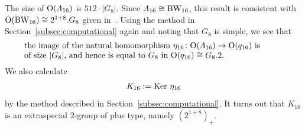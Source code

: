 \documentclass{amsart} %
\begin{document}
%
%
%
 The size of $\mathord{\mathrm{O}}(\varLambda_{16})$ is $512\cdot |G_8|$.
 Since $\varLambda_{16}\cong \mathrm{BW}_{16}$, 
this result is consistent with $\mathord{\mathrm{O}}(\mathrm{BW}_{16})\cong 2^{1+8}.G_8$
given in~\cite[Chapter 4, Section 10]{theCSbook}.
Using the method in Section~\ref{subsec:computational} again
and noting that $G_8$ is simple,
we see that 
%
\begin{equation}\label{eq:Imageeta16}
\parbox{11cm}{
\textrm{%
the image of 
the natural homomorphism $\eta_{16}\colon \OG(\Lamsxtn)\to \OG(q_{16})$  is \\
 of size $|G_8|$, and hence 
is equal to $G_8$ in $\OG(q_{16})\cong G_8.2$.
}
}
\end{equation}
%
%
We also  calculate
\[
K_{16}:=\operatorname{Ker} \,\eta_{16}
\]
by the method described  in Section~\ref{subsec:computational}.
It turns out that 
$K_{16}$ is 
an extraspecial $2$-group of plus type, namely $(2^{1+8})_{+}$.
%
%
%
%
%
%
\end{document}
